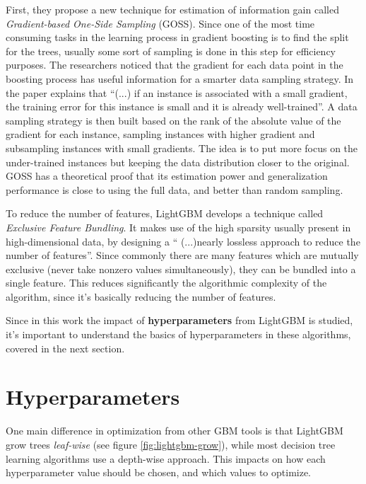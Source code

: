 First, they propose a new technique for estimation of information gain called \textit{Gradient-based One-Side Sampling} (GOSS). Since one of the most time consuming tasks in the learning process in gradient boosting is to find the split for the trees, usually some sort of sampling is done in this step for efficiency purposes. The researchers noticed that the gradient for each data point in the boosting process has useful information for a smarter data sampling strategy. In the paper \cite{ke2017lightgbm} explains that ``(...) if an instance is associated with a small gradient, the training error for this instance is small and it is already well-trained''. A data sampling strategy is then built based on the rank of the absolute value of the gradient for each instance, sampling instances with higher gradient and subsampling instances with small gradients. The idea is to put more focus on the under-trained instances but keeping the data distribution closer to the original. GOSS has a theoretical proof that its estimation power and generalization performance is close to using the full data, and better than random sampling.

To reduce the number of features, LightGBM develops a technique called \textit{Exclusive Feature Bundling}. It makes use of the high sparsity usually present in high-dimensional data, by designing a `` (...)nearly lossless approach to reduce the number of features''. Since commonly there are many features which are mutually exclusive (never take nonzero values simultaneously), they can be bundled into a single feature. This reduces significantly the algorithmic complexity of the algorithm, since it's basically reducing the number of features. 

Since in this work the impact of \textbf{hyperparameters} from LightGBM is studied, it's important to understand the basics of hyperparameters in these algorithms, covered in the next section.

\section{Hyperparameters}

One main difference in optimization from other GBM tools is that LightGBM grow trees \textit{leaf-wise} (see figure \ref{fig:lightgbm-grow}), while most decision tree learning algorithms use a depth-wise approach. This impacts on how each hyperparameter value should be chosen, and which values to optimize. 

